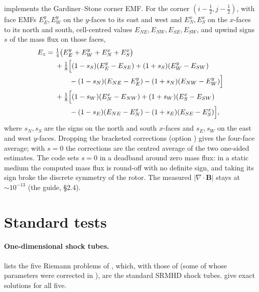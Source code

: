 \documentclass[11pt,a4paper,oneside,openany]{book}
\newcommand{\textcite}{\citet}
\theoremstyle{definition}
\theoremstyle{plain}
\theoremstyle{remark}
\newcommand{\BB}{\bm{B}}
\newcommand{\code}[1]{\texttt{\detokenize{#1}}}
\newcommand{\file}[1]{\texttt{\detokenize{#1}}}
\begin{document}
\begin{codebox}
\file{ct.py} implements the Gardiner--Stone corner EMF. For the corner $(i-\frac12,j-\frac12)$,
with face EMFs $E^{y}_{E},E^{y}_{W}$ on the $y$-faces to its east and west and
$E^{x}_{N},E^{x}_{S}$ on the $x$-faces to its north and south, cell-centred values
$E_{NE},E_{NW},E_{SE},E_{SW}$, and upwind signs $s$ of the mass flux on those faces,
\begin{align*}
E_z={}&\tfrac14\bigl(E^y_E+E^y_W+E^x_N+E^x_S\bigr)\\
&+\tfrac18\Bigl[(1-s_S)(E^y_E-E_{SE})+(1+s_S)(E^y_W-E_{SW})\\
&\qquad-(1-s_N)(E_{NE}-E^y_E)-(1+s_N)(E_{NW}-E^y_W)\Bigr]\\
&+\tfrac18\Bigl[(1-s_W)(E^x_N-E_{NW})+(1+s_W)(E^x_S-E_{SW})\\
&\qquad-(1-s_E)(E_{NE}-E^x_N)-(1+s_E)(E_{SE}-E^x_S)\Bigr],
\end{align*}
where $s_N,s_S$ are the signs on the north and south $x$-faces and $s_E,s_W$ on the east and
west $y$-faces. Dropping the bracketed corrections (option \code{upwind=False}) gives the
four-face average; with $s=0$ the corrections are the centred average of the two one-sided
estimates. The code sets $s=0$ in a deadband around zero mass flux: in a static medium the
computed mass flux is round-off with no definite sign, and taking its sign broke the discrete
symmetry of the rotor. The measured
$|\nabla\cdot\BB|$ stays at $\sim10^{-13}$ (the guide, \S2.4).
\end{codebox}

\section{Standard tests}\label{sec:tests}

\paragraph{One-dimensional shock tubes.}  lists the five Riemann problems of
\textcite{Balsara2001}, which, with those of \textcite{Komissarov1999} (some of whose
parameters were corrected in \textcite{Komissarov2002tests}), are the standard SRMHD shock
tubes. \textcite{GiacomazzoRezzolla2006} give exact solutions for all five.
\end{document}
